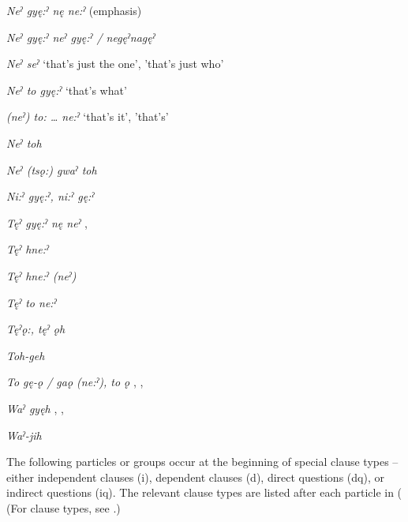 \begin{multicols}{2}
\textit{Neˀ gyę:ˀ nę ne:ˀ} (emphasis)

\textit{Neˀ gyę:ˀ neˀ gyę:ˀ / negęˀnagęˀ} 

\textit{Neˀ seˀ} ‘that’s just the one’, 'that’s just who’

\textit{Neˀ to gyę:ˀ} ‘that’s what’

\textit{(neˀ) to: … ne:ˀ} ‘that’s it’, 'that’s’

\textit{Neˀ toh} 

\textit{Neˀ (tsǫ:) gwaˀ toh} 

\textit{Ni:ˀ gyę:ˀ, ni:ˀ gę:ˀ} 

\textit{Tęˀ gyę:ˀ nę neˀ} , 

\textit{Tęˀ hne:ˀ} 

\textit{Tęˀ hne:ˀ (neˀ)} 

\textit{Tęˀ to ne:ˀ} 

\textit{Tęˀǫ:, tęˀ ǫh} 

\textit{Toh-geh} 

\textit{To gę-ǫ / gaǫ (ne:ˀ), to ǫ} , , 

\textit{Waˀ gyęh} , , 

\textit{Waˀ-jih} 
\end{multicols}
\z

The following particles or groups occur at the beginning of special clause types -- either independent clauses (i), dependent clauses (d), direct questions (dq), or indirect questions (iq). The relevant clause types are listed after each particle in ( (For clause types, see .)


